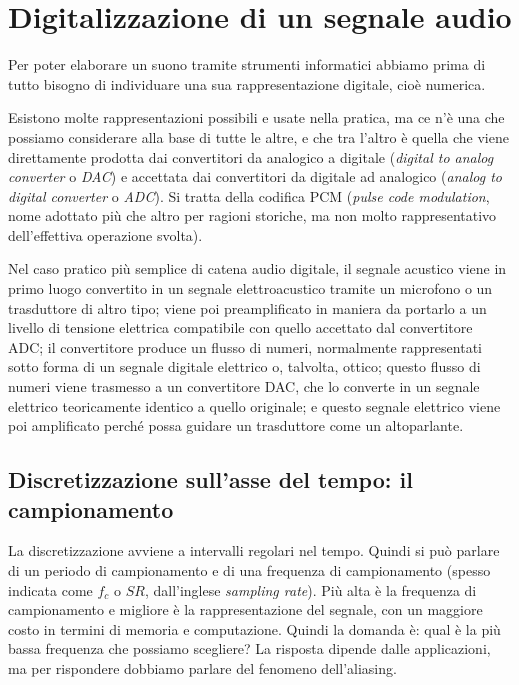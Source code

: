 
\chapter{Digitalizzazione di un segnale audio}

Per poter elaborare un suono tramite strumenti informatici abbiamo prima di tutto bisogno di individuare una sua rappresentazione digitale, cioè numerica.

Esistono molte rappresentazioni possibili e usate nella pratica, ma ce n'è una che possiamo considerare alla base di tutte le altre, e che tra l'altro è quella che viene direttamente prodotta dai convertitori da analogico a digitale (\emph{digital to analog converter} o \emph{DAC}) e accettata dai convertitori da digitale ad analogico (\emph{analog to digital converter} o \emph{ADC}). Si tratta della codifica PCM (\emph{pulse code modulation}, nome adottato più che altro per ragioni storiche, ma non molto rappresentativo dell'effettiva operazione svolta).

Nel caso pratico più semplice di catena audio digitale, il segnale acustico viene in primo luogo convertito in un segnale elettroacustico tramite un microfono o un trasduttore di altro tipo; viene poi preamplificato in maniera da portarlo a un livello di tensione elettrica compatibile con quello accettato dal convertitore ADC; il convertitore produce un flusso di numeri, normalmente rappresentati sotto forma di un segnale digitale elettrico o, talvolta, ottico; questo flusso di numeri viene trasmesso a un convertitore DAC, che lo converte in un segnale elettrico teoricamente identico a quello originale; e questo segnale elettrico viene poi amplificato perché possa guidare un trasduttore come un altoparlante.


\section{Discretizzazione sull'asse del tempo: il campionamento}

La discretizzazione avviene a intervalli regolari nel tempo. Quindi si può parlare di un periodo di campionamento e di una frequenza di campionamento (spesso indicata come $f_c$ o $SR$, dall'inglese \emph{sampling rate}). Più alta è la frequenza di campionamento e migliore è la rappresentazione del segnale, con un maggiore costo in termini di memoria e computazione. Quindi la domanda è: qual è la più bassa frequenza che possiamo scegliere? La risposta dipende dalle applicazioni, ma per rispondere dobbiamo parlare del fenomeno dell'aliasing.


